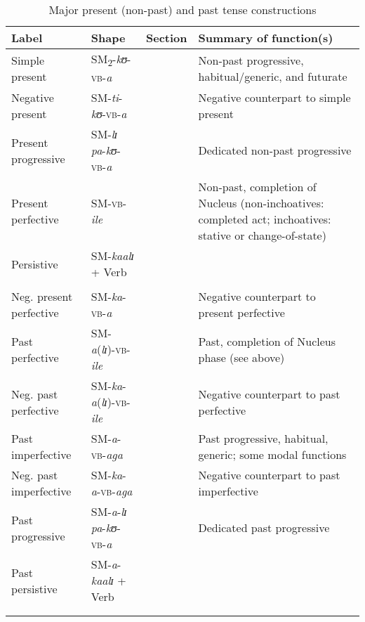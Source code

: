 \begin{sidewaystable}
\begin{tabularx}{\textwidth}{lllX}
\lsptoprule
\footnotesize{Label} & \footnotesize{Shape} &\footnotesize{Section} & \footnotesize{Summary of function(s)}\\
\midrule
Simple present & SM\textsubscript{2}-\textit{kʊ}-\textsc{vb}-\textit{a} &  & Non-past progressive, habitual/generic, and futurate\\
Negative present & SM-\textit{ti}-\textit{kʊ}-\textsc{vb}-\textit{a} &  & Negative counterpart to simple present\\
Present progressive & SM-\textit{lɪ} \textit{pa}-\textit{kʊ}-\textsc{vb}-\textit{a} &  & Dedicated non-past progressive \\ 
Present perfective & SM-\textsc{vb}-\textit{ile} &  & Non-past, completion of Nucleus (non-inchoatives: completed act; inchoatives: stative or change-of-state)\\
Persistive & SM-\textit{kaalɪ} + Verb &  & \\
& & & \\
Neg. present perfective & SM-\textit{ka}-\textsc{vb}-\textit{a} &  & Negative counterpart to present perfective\\
Past perfective & SM-\textit{a}(\textit{lɪ})-\textsc{vb}-\textit{ile} &  & Past, completion of Nucleus phase (see above)\\
Neg. past perfective & SM-\textit{ka}-\textit{a}(\textit{lɪ})-\textsc{vb}-\textit{ile} &  & Negative counterpart to past perfective\\
Past imperfective & SM-\textit{a}-\textsc{vb}-\textit{aga} &  & Past progressive, habitual, generic; some modal functions\\
Neg. past imperfective & SM-\textit{ka}-\textit{a}-\textsc{vb}-\textit{aga} &  & Negative counterpart to past imperfective\\
Past progressive & SM-\textit{a}-\textit{lɪ} \textit{pa}-\textit{kʊ}-\textsc{vb}-\textit{a} &  & Dedicated past progressive \\ 
Past persistive & SM-\textit{a}-\textit{kaalɪ} + Verb &  & \\
& & &\\
\lspbottomrule
\end{tabularx}	
\caption{Major present (non-past) and past tense constructions}\label{tabAppendixPRSPST}
\end{sidewaystable}	


